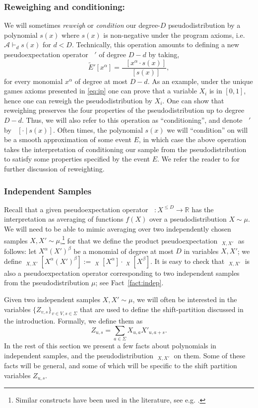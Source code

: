 \documentclass[11pt]{article}
\DeclareMathOperator*{\pE}{\widetilde{\mathbb{E}}}
\def \R {\mathbb{R}}
\def \cA {\mathcal{A}}
\theoremstyle{definition}
\begin{document}
\subsubsection{Reweighing and conditioning:} 
We will sometimes {\em reweigh} or {\em condition} our degree-$D$ pseudodistribution by a polynomial $s(x)$ where $s(x)$ is non-negative under the program axioms, i.e. $\cA \vdash_{d} s(x)$ for $d < D$. Technically, this operation amounts to defining a new pseudoexpectation operator $\pE'$  of degree $D-d$ by taking, 
\[\widetilde{E}'[x^{\alpha}] = \frac{\pE[x^{\alpha} \cdot s(x)]}{\pE[s(x)]},\] 
for every monomial $x^{\alpha}$ of degree at most $D - d$. As an example, under the unique games axioms presented in \ref{eq:ip} one can prove that a variable $X_i$ is in $[0,1]$, hence one can reweigh the pseudodistribution by $X_i$. One can show that reweighing preserves the four properties of the pseudodistribution up to degree $D - d$.
Thus, we will also refer to this operation as ``conditioning'', and denote $\pE'$ by $\pE[\cdot ~|~ s(x)]$. Often times, the polynomial $s(x)$ we will ``condition'' on 
will be a smooth approximation of some event $E$, in which case the above operation takes the interpretation of conditioning our sample from the pseudodistribution to satisfy some properties specified by the event $E$. We refer the reader to \cite{BarakRS11,BKS17} for further discussion of reweighting.


\subsubsection{Independent Samples}\label{sec:ind_samples}
Recall that a given pseudoexpectation operator $\pE: X^{\leq D} \rightarrow \R$ has the interpretation as averaging of functions $f(X)$ over a pseudodistribution $X\sim\mu$.  
We will need to be able to mimic averaging over two 
independently chosen samples $X,X'\sim \mu$,\footnote{Similar constructs have been used in the literature, see e.g. \cite{BarakKS14}.} for that 
we define the product pseudoexpectation $\pE_{X,X'}$ 
as follows: let $X^{\alpha}(X')^{\beta}$ be a monomial 
of degree at most $D$ in variables $X,X'$; we define  $\pE_{X,X'}[X^{\alpha}(X')^{\beta}] := \pE_{X}[X^{\alpha}] \cdot \pE_X[X^{\beta}]$. It is easy to check that $\pE_{X,X'}$ 
is also a pseudoexpectation operator corresponding to two 
independent samples from the pseudodistribution $\mu$; 
see Fact~\ref{fact:indep}.

Given two independent samples $X,X'\sim \mu$, we will often be
interested in the variables $\{Z_{v,s}\}_{v\in V, s\in\Sigma}$ 
that are used to define the shift-partition discussed in the introduction. Formally, we define them as
\[
Z_{u,s} = \sum_{a \in \Sigma} X_{u,a} X'_{u,a+s}.
\]
In the rest of this section we present a few facts about polynomials in independent samples,
and the pseudodistribution $\pE_{X,X'}$ on them. 
Some of these facts will be general, and some of which 
will be specific to the shift partition variables $Z_{u,s}$.
\end{document}
